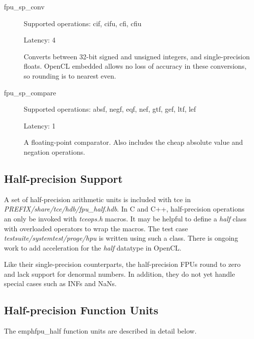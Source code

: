 \documentclass[twoside]{tceusermanual}
\begin{document}
\begin{description}
\item[fpu\_sp\_conv]

Supported operations:         cif, cifu, cfi, cfiu

Latency:             4

Converts between 32-bit signed and unsigned integers, and single-precision floats. OpenCL embedded allows no loss of accuracy in these conversions, so rounding is to nearest even.

\item[fpu\_sp\_compare]

Supported operations:         absf, negf, eqf, nef, gtf, gef, ltf, lef

Latency:             1

A floating-point comparator. Also includes the cheap absolute value and negation operations.


\end{description}

\subsection{Half-precision Support}

A set of half-precision arithmetic units is included with tce in \emph{PREFIX/share/tce/hdb/fpu\_half.hdb}. In C and C++,
half-precision operations an only be invoked with \emph{tceops.h} macros. It may be helpful to define a \emph{half}
class with overloaded operators to wrap the macros. The test case \emph{testsuite/systemtest/proge/hpu} is written
using such a class. There is ongoing work to add acceleration for the \emph{half} datatype in OpenCL.

Like their single-precision counterparts, the half-precision FPUs round to zero and lack support for denormal numbers.
In addition, they do not yet handle special cases such as INFs and NaNs.

\subsection{Half-precision Function Units}

The emph{fpu\_half} function units are described in detail below.
\end{document}
